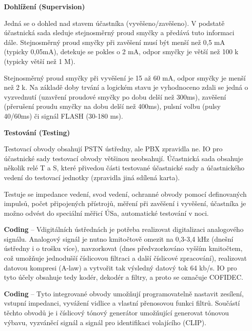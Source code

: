 \noindent\textbf{Dohlížení (Supervision)}

Jedná se o dohled nad stavem účastníka (vyvěšeno/zavěšeno). V podstatě účastnická sada sleduje stejnosměrný proud smyčky a předává tuto informaci dále. Stejnosměrný proud smyčky při zavěšení musí být menší než 0,5 mA (typicky 0,05mA), detekuje se pokles o 2 mA, odpor smyčky je větší než 100 k (typicky větší než 1 M).

Stejnosměrný proud smyčky při vyvěšení je 15 až 60 mA, odpor smyčky je menší než 2 k. Na základě doby trvání a logickém stavu je vyhodnoceno zdali se jedná o vyzvednutí (uzavření proudové smyčky po dobu delší než 300ms), zavěšení (přerušení proudu smyčky na dobu delší než 400ms), pulsní volbu (pulsy 40/60ms) či signál FLASH (30-180 ms).

\noindent\textbf{Testování (Testing)}

Testovací obvody obsahují PSTN ústředny, ale PBX zpravidla ne. IO pro účastnické sady testovací obvody většinou neobsahují. Účastnická sada obsahuje několik relé T a S, které přivedou části testované účastnické sady a účastnického vedení do testovací jednotky (zpravidla jiná sdílená karta).

Testuje se impedance vedení, svod vedení, ochranné obvody pomocí definovaných impulsů, počet připojených přístrojů, měření při zavěšení i vyvěšení, účastníka je možno odvést do speciální měřicí ÚSa, automatické testování v noci.


\textbf{Coding} -- Vdigitálních ústřednách je potřeba realizovat digitalizaci analogového signálu. Analogový signál je nutno kmitočtově omezit na 0,3-3,4 kHz (dnešní ústředny i o trošku více), navzorkovat  (dnes předvzorkováno vyšším kmitočtem, což umožňuje jednodušší číslicovou filtraci a další číslicové zpracování), realizovat datovou kompresi (A-law) a vytvořit tak výsledný datový tok 64 kb/s. IO pro tyto účely obsahuje tedy kodér, dekodér a filtry, a proto se označuje COFIDEC.

\noindent\textbf{Coding} -- Tyto integrované obvody umožňují programovatelně nastavit zesílení, vstupní impedanci, vyvážení vidlice a vlastní přenosovou funkci filtrů. Součástí těchto obvodů je i číslicový tónový generátor umožňující generovat tónovou výbavu, vyzváněcí signál a signál pro identifikaci volajícího (CLIP).

